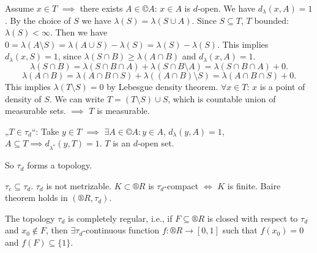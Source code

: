 \documentclass[12pt]{article}					%
\begin{document}
\begin{veta}
\begin{dukazin}
		Assume $x \in T$ $\implies$ there exists $A \in ©A$: $x \in A$ is $d$-open. We have $d_λ(x, A) = 1$. By the choice of $S$ we have $λ(S) = λ(S \cup A)$. Since $S \subseteq T$, $T$ bounded: $λ(S) < ∞$. Then we have $0 = λ(A \setminus S) = λ(A \cup S) - λ(S) = λ(S) - λ(S)$. This implies $d_λ(x, S) = 1$, since $λ(S \cap B) ≥ λ(A \cap B)$ and $d_λ(x, A) = 1$.
		$$ λ(S \cap B) = λ(S \cap B \cap A) + λ(S \cap B \setminus A) = λ(S \cap B \cap A) + 0. $$
		$$ λ(A \cap B) = λ(A \cap B \cap S) + λ((A \cap B) \setminus S) = λ(A \cap B \cap S) + 0. $$
		This implies $λ(T \setminus S) = 0$ by Lebesgue density theorem. $\forall x \in T$: $x$ is a point of density of $S$. We can write $T = (T \setminus S) \cup S$, which is countable union of measurable sets. $\implies$ $T$ is measurable.

		„$T \in τ_d$“: Take $y \in T$ $\implies$ $\exists A \in ©A: y \in A$, $d_λ(y, A) = 1$, $A \subseteq T \implies d_{λ^*}(y, T) = 1$. $T$ is an $d$-open set.

		So $τ_d$ forms a topology.
	\end{dukazin}
\end{veta}

\begin{poznamka}[Properties of $τ_d$]
	$τ_e \subseteq τ_d$. $τ_d$ is not metrizable. $K \subset ®R$ is $τ_d$-compact $\Leftrightarrow$ $K$ is finite. Baire theorem holds in $(®R, τ_d)$.
\end{poznamka}

\begin{veta}
	The topology $τ_d$ is completely regular, i.e., if $F \subseteq ®R$ is closed with respect to $τ_d$ and $x_0 \notin F$, then $\exists τ_d$-continuous function $f: ®R \rightarrow [0, 1]$ such that $f(x_0) = 0$ and $f(F) \subseteq \{1\}$.
\end{veta}
\end{document}
